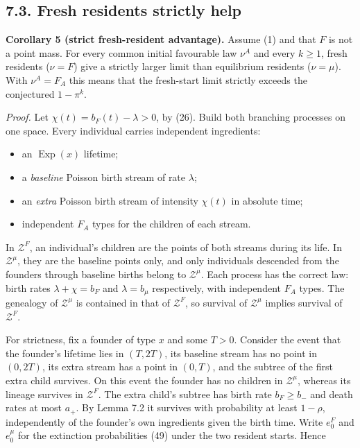 \documentclass[
  british,
  11pt,
  a4paper,
]{article}
\providecommand{\tightlist}{%
  \setlength{\itemsep}{0pt}\setlength{\parskip}{0pt}}
\begin{document}
\subsection{7.3. Fresh residents strictly
help}\label{fresh-residents-strictly-help}

\textbf{Corollary 5 (strict fresh-resident advantage).} Assume (1) and
that \(F\) is not a point mass. For every common initial favourable law
\(\nu^A\) and every \(k\ge1\), fresh residents (\(\nu=F\)) give a
strictly larger limit than equilibrium residents (\(\nu=\mu\)). With
\(\nu^A=F_A\) this means that the fresh-start limit strictly exceeds the
conjectured \(1-\pi^k\).

\emph{Proof.} Let \(\chi(t)=b_F(t)-\lambda>0\), by (26). Build both
branching processes on one space. Every individual carries independent
ingredients:

\begin{itemize}
\tightlist
\item
  an \(\operatorname{Exp}(x)\) lifetime;
\item
  a \emph{baseline} Poisson birth stream of rate \(\lambda\);
\item
  an \emph{extra} Poisson birth stream of intensity \(\chi(t)\) in
  absolute time;
\item
  independent \(F_A\) types for the children of each stream.
\end{itemize}

In \(\mathcal Z^F\), an individual's children are the points of both
streams during its life. In \(\mathcal Z^\mu\), they are the baseline
points only, and only individuals descended from the founders through
baseline births belong to \(\mathcal Z^\mu\). Each process has the
correct law: birth rates \(\lambda+\chi=b_F\) and \(\lambda=b_\mu\)
respectively, with independent \(F_A\) types. The genealogy of
\(\mathcal Z^\mu\) is contained in that of \(\mathcal Z^F\), so survival
of \(\mathcal Z^\mu\) implies survival of \(\mathcal Z^F\).

For strictness, fix a founder of type \(x\) and some \(T>0\). Consider
the event that the founder's lifetime lies in \((T,2T)\), its baseline
stream has no point in \((0,2T)\), its extra stream has a point in
\((0,T)\), and the subtree of the first extra child survives. On this
event the founder has no children in \(\mathcal Z^\mu\), whereas its
lineage survives in \(\mathcal Z^F\). The extra child's subtree has
birth rate \(b_F\ge b_-\) and death rates at most \(a_+\). By Lemma 7.2
it survives with probability at least \(1-\rho\), independently of the
founder's own ingredients given the birth time. Write \(e^F_0\) and
\(e^\mu_0\) for the extinction probabilities (49) under the two resident
starts. Hence
\end{document}

